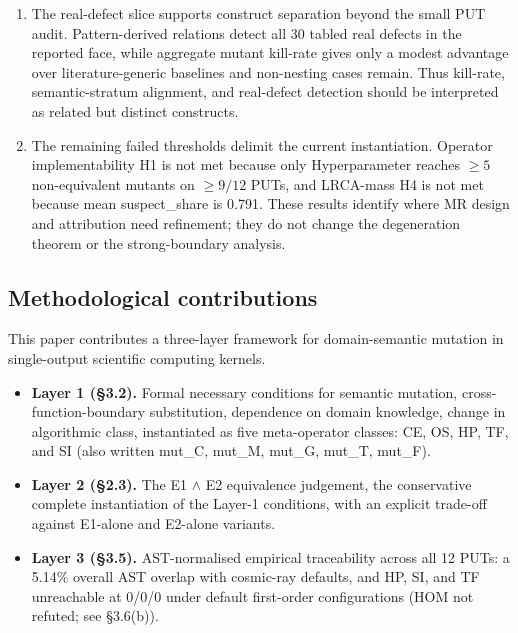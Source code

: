 \documentclass[manuscript,screen,review]{acmart}
\begin{document}
\begin{enumerate}[label=(\alph*)]
  and Pattern Coverage is 0.163 at \(n = 12\), so orthogonality remains
  a future hypothesis.
\item
  The real-defect slice supports construct separation beyond the small
  PUT audit. Pattern-derived relations detect all 30 tabled real defects
  in the reported face, while aggregate mutant kill-rate gives only a
  modest advantage over literature-generic baselines and non-nesting
  cases remain. Thus kill-rate, semantic-stratum alignment, and
  real-defect detection should be interpreted as related but distinct
  constructs.
\item
  The remaining failed thresholds delimit the current instantiation.
  Operator implementability H1 is not met because only Hyperparameter
  reaches \(\geq 5\) non-equivalent mutants on \(\geq 9/12\) PUTs, and
  LRCA-mass H4 is not met because mean suspect\_share is 0.791. These
  results identify where MR design and attribution need refinement; they
  do not change the degeneration theorem or the strong-boundary
  analysis.
\end{enumerate}

\subsection{Methodological contributions}\label{methodological-contributions}

This paper contributes a three-layer framework for domain-semantic
mutation in single-output scientific computing kernels.

\begin{itemize}

\item
  \textbf{Layer 1 (§3.2).} Formal necessary conditions for semantic
  mutation, cross-function-boundary substitution, dependence on domain
  knowledge, change in algorithmic class, instantiated as five
  meta-operator classes: CE, OS, HP, TF, and SI (also written mut\_C,
  mut\_M, mut\_G, mut\_T, mut\_F).
\item
  \textbf{Layer 2 (§2.3).} The E1 $\wedge$ E2 equivalence judgement, the
  conservative complete instantiation of the Layer-1 conditions, with an
  explicit trade-off against E1-alone and E2-alone variants.
\item
  \textbf{Layer 3 (§3.5).} AST-normalised empirical traceability across
  all 12 PUTs: a 5.14\% overall AST overlap with cosmic-ray defaults,
  and HP, SI, and TF unreachable at 0/0/0 under default first-order
  configurations (HOM not refuted; see §3.6(b)).
\end{itemize}
\end{document}
